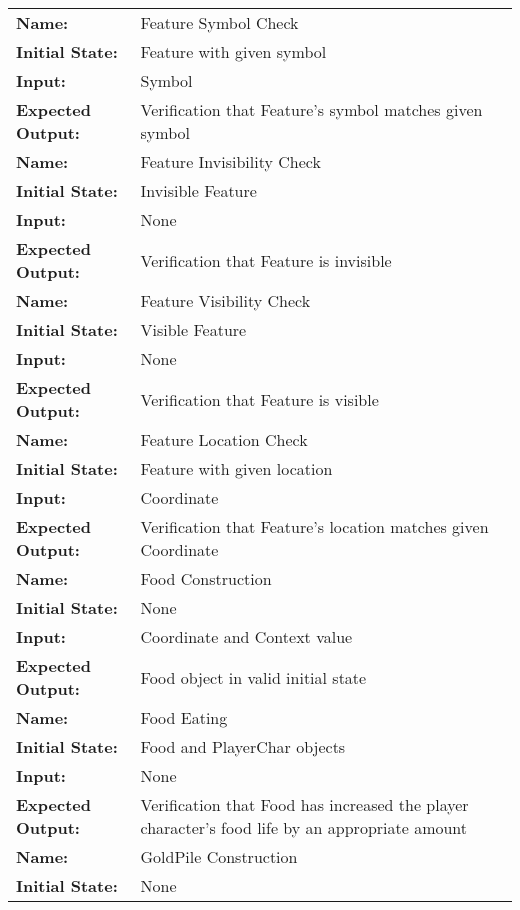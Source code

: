 \documentclass[12pt, titlepage]{article}
\begin{document}
\begin{center}
\begin{longtable}{ l | p{10cm} }
				\hline
				\rule{0pt}{1.5em}\textbf{Name:} & Feature Symbol Check\\
				\textbf{Initial State:} & Feature with given symbol\\
				\textbf{Input:} & Symbol\\
				\textbf{Expected Output:} & Verification that Feature's symbol matches given symbol\\[0.6em]
				\hline
				\rule{0pt}{1.5em}\textbf{Name:} & Feature Invisibility Check\\
				\textbf{Initial State:} & Invisible Feature\\
				\textbf{Input:} & None\\
				\textbf{Expected Output:} & Verification that Feature is invisible\\[0.6em]
				\hline
				\rule{0pt}{1.5em}\textbf{Name:} & Feature Visibility Check\\
				\textbf{Initial State:} & Visible Feature\\
				\textbf{Input:} & None\\
				\textbf{Expected Output:} & Verification that Feature is visible\\[0.6em]
				\hline
				\rule{0pt}{1.5em}\textbf{Name:} & Feature Location Check\\
				\textbf{Initial State:} & Feature with given location\\
				\textbf{Input:} & Coordinate\\
				\textbf{Expected Output:} & Verification that Feature's location matches given Coordinate\\[0.6em]
				\hline
				\rule{0pt}{1.5em}\textbf{Name:} & Food Construction\\
				\textbf{Initial State:} & None\\
				\textbf{Input:} & Coordinate and Context value\\
				\textbf{Expected Output:} & Food object in valid initial state\\[0.6em]
				\hline
				\rule{0pt}{1.5em}\textbf{Name:} & Food Eating\\
				\textbf{Initial State:} & Food and PlayerChar objects\\
				\textbf{Input:} & None\\
				\textbf{Expected Output:} & Verification that Food has increased the player character's food life by an appropriate amount\\[0.6em]
				\hline
				\rule{0pt}{1.5em}\textbf{Name:} & GoldPile Construction\\
				\textbf{Initial State:} & None\\

\end{longtable}
\end{center}
\end{document}
